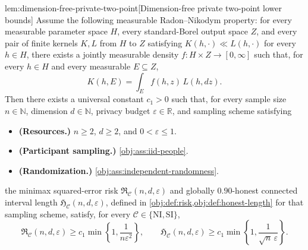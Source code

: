 \documentclass[11pt]{article}
\begin{document}
\begin{lemmav}{lem:dimension-free-private-two-point}[Dimension-free private two-point lower bounds]
Assume the following measurable Radon--Nikodym property: for every measurable parameter space \(H\), every standard-Borel output space \(Z\), and every pair of finite kernels \(K,L\) from \(H\) to \(Z\) satisfying \(K(h,\cdot)\ll L(h,\cdot)\) for every \(h\in H\), there exists a jointly measurable density \(f:H\times Z\to[0,\infty]\) such that, for every \(h\in H\) and every measurable \(E\subseteq Z\),
\[
K(h,E)=\int_E f(h,z)\,L(h,dz).
\]
Then there exists a universal constant \(c_1>0\) such that, for every sample size \(n\in\mathbb N\), dimension \(d\in\mathbb N\), privacy budget \(\varepsilon\in\mathbb R\), and sampling scheme satisfying
\begin{itemize}
\item \textbf{(Resources.)} \(n\ge2\), \(d\ge2\), and \(0<\varepsilon\le1\).
\item \textbf{(Participant sampling.)} \cref{obj:ass:iid-people}.
\item \textbf{(Randomization.)} \cref{obj:ass:independent-randomness}.
\end{itemize}
the minimax squared-error risk \(\mathfrak R_{\mathcal C}(n,d,\varepsilon)\) and globally \(0.90\)-honest connected interval length \(\mathfrak H_{\mathcal C}(n,d,\varepsilon)\), defined in \cref{obj:def:risk,obj:def:honest-length} for that sampling scheme, satisfy, for every \(\mathcal C\in\{\mathrm{NI},\mathrm{SI}\}\),
\[
\mathfrak R_{\mathcal C}(n,d,\varepsilon)
\ge c_1\min\left\{1,\frac{1}{n\varepsilon^2}\right\},
\qquad
\mathfrak H_{\mathcal C}(n,d,\varepsilon)
\ge c_1\min\left\{1,\frac{1}{\sqrt n\,\varepsilon}\right\}.
\]
\end{lemmav}
\end{document}
